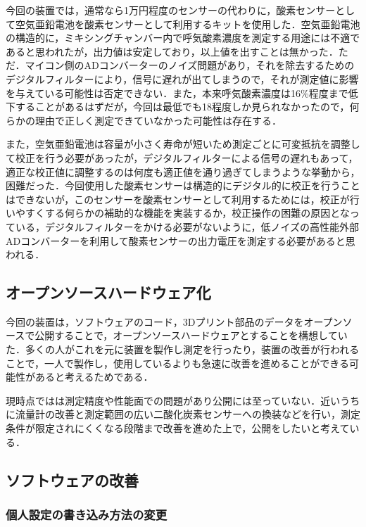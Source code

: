 今回の装置では，通常なら1万円程度のセンサーの代わりに，酸素センサーとして空気亜鉛電池を酸素センサーとして利用するキットを使用した．空気亜鉛電池の構造的に，ミキシングチャンバー内で呼気酸素濃度を測定する用途には不適であると思われたが，出力値は安定しており，以上値を出すことは無かった．ただ．マイコン側のADコンバーターのノイズ問題があり，それを除去するためのデジタルフィルターにより，信号に遅れが出てしまうので，それが測定値に影響を与えている可能性は否定できない．また，本来呼気酸素濃度は16\%程度まで低下することがあるはずだが，今回は最低でも18\％程度しか見られなかったので，何らかの理由で正しく測定できていなかった可能性は存在する．

また，空気亜鉛電池は容量が小さく寿命が短いため測定ごとに可変抵抗を調整して校正を行う必要があったが，デジタルフィルターによる信号の遅れもあって，適正な校正値に調整するのは何度も適正値を通り過ぎてしまうような挙動から，困難だった．今回使用した酸素センサーは構造的にデジタル的に校正を行うことはできないが，このセンサーを酸素センサーとして利用するためには，校正が行いやすくする何らかの補助的な機能を実装するか，校正操作の困難の原因となっている，デジタルフィルターをかける必要がないように，低ノイズの高性能外部ADコンバーターを利用して酸素センサーの出力電圧を測定する必要があると思われる．

\subsection{オープンソースハードウェア化}

今回の装置は，ソフトウェアのコード，3Dプリント部品のデータをオープンソースで公開することで，オープンソースハードウェアとすることを構想していた．多くの人がこれを元に装置を製作し測定を行ったり，装置の改善が行われることで，一人で製作し，使用しているよりも急速に改善を進めることができる可能性があると考えるためである．

現時点ではは測定精度や性能面での問題があり公開には至っていない．近いうちに流量計の改善と測定範囲の広い二酸化炭素センサーへの換装などを行い，測定条件が限定されにくくなる段階まで改善を進めた上で，公開をしたいと考えている．

\subsection{ソフトウェアの改善}

\subsubsection{個人設定の書き込み方法の変更}

